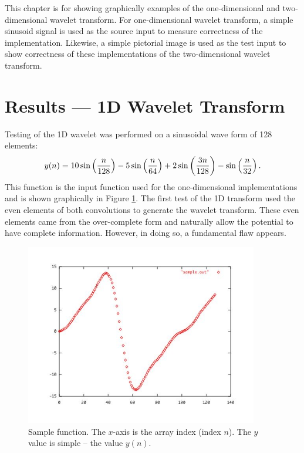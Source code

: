 This chapter is for showing graphically examples of the one-dimensional and two-dimensional wavelet transform.  For one-dimensional wavelet transform, a simple sinusoid signal is used as the source input to measure correctness of the implementation.   Likewise, a simple pictorial image is used as the test input to show correctness of these implementations of the two-dimensional wavelet transform.  

\section{Results --- 1D Wavelet Transform}

Testing of the 1D wavelet was performed on a sinusoidal wave form of 128 elements:
\begin{equation}\label{sinusoid}
y(n) = 10 \sin \left({n \over 128}\right) 
	- 5 \sin \left({n \over 64}\right) 
	+ 2 \sin \left({3 n \over 128}\right)
	- \sin \left({n \over 32}\right).
\end{equation}
This function  is the input function used for the one-dimensional implementations and is shown graphically in Figure \ref{sample}. The first test of the 1D transform used the even elements of both convolutions to generate the wavelet transform.  These even elements came from the over-complete form and naturally allow the potential to have complete information.  However, in doing so, a fundamental flaw appears.

\begin{figure}
\begin{center}\includegraphics [width=4in]{sample.jpg} \end{center}
\caption{Sample function.  The $x$-axis is the array index (index $n$).  The $y$ value is simple -- the value $y(n)$. }
\label{sample}
\end{figure}

